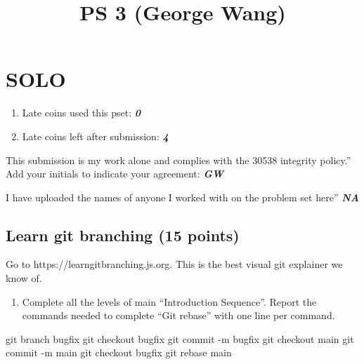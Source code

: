 \documentclass[
  letterpaper,
  DIV=11,
  numbers=noendperiod]{scrartcl}
\title{PS 3 (George Wang)}
\author{}
\date{}
\newenvironment{Shaded}{\begin{snugshade}}{\end{snugshade}}
\newcommand{\NormalTok}[1]{\textcolor[rgb]{0.00,0.23,0.31}{#1}}
\providecommand{\tightlist}{%
  \setlength{\itemsep}{0pt}\setlength{\parskip}{0pt}}\usepackage{longtable,booktabs,array}
\begin{document}
\maketitle



\section{SOLO}\label{solo}

\begin{enumerate}
\def\labelenumi{\arabic{enumi}.}
\tightlist
\item
  Late coins used this pset: \textbf{\emph{0}}
\item
  Late coins left after submission: \textbf{\emph{4}}
\end{enumerate}

This submission is my work alone and complies with the 30538 integrity
policy.'' Add your initials to indicate your agreement:
\textbf{\emph{GW}}

I have uploaded the names of anyone I worked with on the problem set
here'' \textbf{\emph{NA}}

\subsection{Learn git branching (15
points)}\label{learn-git-branching-15-points}

Go to https://learngitbranching.js.org. This is the best visual git
explainer we know of.

\begin{enumerate}
\def\labelenumi{\arabic{enumi}.}
\tightlist
\item
  Complete all the levels of main ``Introduction Sequence''. Report the
  commands needed to complete ``Git rebase'' with one line per command.
\end{enumerate}

\begin{Shaded}
\begin{Highlighting}[]
\NormalTok{git branch bugfix}
\NormalTok{git checkout bugfix}
\NormalTok{git commit {-}m \textquotesingle{}bugfix\textquotesingle{}}
\NormalTok{git checkout main}
\NormalTok{git commit {-}m \textquotesingle{}main\textquotesingle{}}
\NormalTok{git checkout bugfix}
\NormalTok{git rebase main}
\end{Highlighting}
\end{Shaded}
\end{document}
